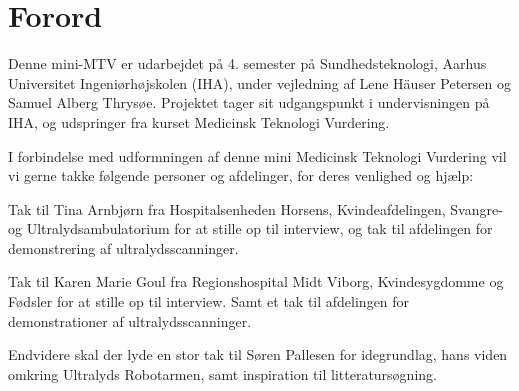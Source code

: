 \chapter{Forord}
Denne mini-MTV er udarbejdet på 4. semester på Sundhedsteknologi, Aarhus Universitet Ingeniørhøjskolen (IHA), under vejledning af Lene Häuser Petersen og Samuel Alberg Thrysøe. Projektet tager sit udgangspunkt i undervisningen på IHA, og udspringer fra kurset Medicinsk Teknologi Vurdering. 


I forbindelse med udformningen af denne mini Medicinsk Teknologi Vurdering vil vi gerne takke følgende personer og afdelinger, for deres venlighed og hjælp:


Tak til Tina Arnbjørn fra Hospitalsenheden Horsens, Kvindeafdelingen, Svangre- og Ultralydsambulatorium for at stille op til interview, og tak til afdelingen for demonstrering af ultralydsscanninger. 


Tak til Karen Marie Goul fra Regionshospital Midt Viborg, Kvindesygdomme og Fødsler for at stille op til interview. Samt et tak til afdelingen for demonstrationer af ultralydsscanninger. 


Endvidere skal der lyde en stor tak til Søren Pallesen for idegrundlag, hans viden omkring Ultralyds Robotarmen, samt inspiration til litteratursøgning. 

